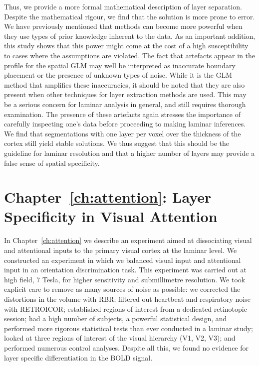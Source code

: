 Thus, we provide a more formal mathematical description of layer separation. Despite the mathematical rigour, we find that the solution is more prone to error. We have previously mentioned that methods can become more powerful when they use types of prior knowledge inherent to the data. As an important addition, this study shows that this power might come at the cost of a high susceptibility to cases where the assumptions are violated. The fact that artefacts appear in the profile for the spatial GLM may well be interpreted as inaccurate boundary placement or the presence of unknown types of noise. While it is the GLM method that amplifies these inaccuracies, it should be noted that they are also present when other techniques for layer extraction methods are used. This may be a serious concern for laminar analysis in general, and still requires thorough examination. The presence of these artefacts again stresses the importance of carefully inspecting one’s data before proceeding to making laminar inferences. We find that segmentations with one layer per voxel over the thickness of the cortex still yield stable solutions. We thus suggest that this should be the guideline for laminar resolution and that a higher number of layers may provide a false sense of spatial specificity.

\section*{Chapter~\ref{ch:attention}: Layer Specificity in Visual Attention}
In Chapter~\ref{ch:attention} we describe an experiment aimed at dissociating visual and attentional inputs to the primary visual cortex at the laminar level. We constructed an experiment in which we balanced visual input and attentional input in an orientation discrimination task. This experiment was carried out at high field, 7 Tesla, for higher sensitivity and submillimetre resolution. We took explicit care to remove as many sources of noise as possible: we corrected the distortions in the volume with RBR; filtered out heartbeat and respiratory noise with RETROICOR; established regions of interest from a dedicated retinotopic session; had a high number of subjects, a powerful statistical design, and performed more rigorous statistical tests than ever conducted in a laminar study; looked at three regions of interest of the visual hierarchy (V1, V2, V3); and performed numerous control analyses. Despite all this, we found no evidence for layer specific differentiation in the BOLD signal.

